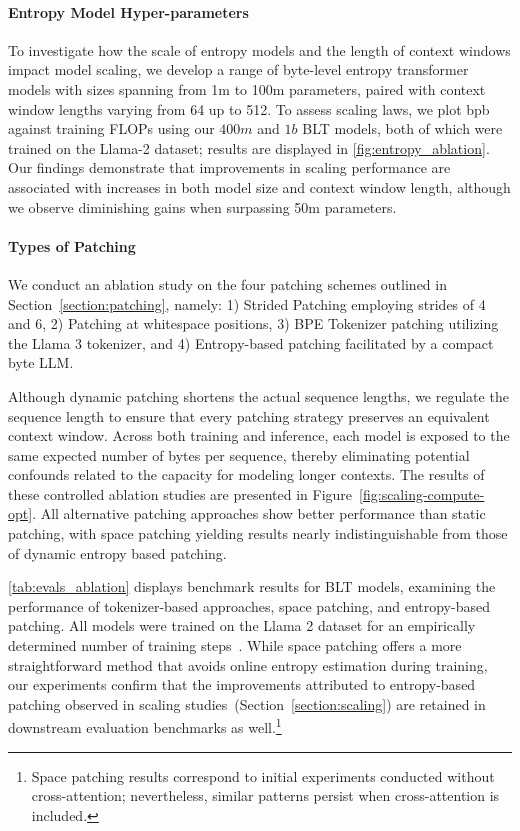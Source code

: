 \paragraph{Entropy Model Hyper-parameters} To investigate how the scale of entropy models and the length of context windows impact model scaling, we develop a range of byte-level entropy transformer models with sizes spanning from 1m to 100m parameters, paired with context window lengths varying from 64 up to 512. To assess scaling laws, we plot bpb against training FLOPs using our $400m$ and $1b$ {\textsc BLT} models, both of which were trained on the Llama-2 dataset; results are displayed in \autoref{fig:entropy_ablation}. Our findings demonstrate that improvements in scaling performance are associated with increases in both model size and context window length, although we observe diminishing gains when surpassing 50m parameters.

\paragraph{Types of Patching}

We conduct an ablation study on the four patching schemes outlined in Section~\ref{section:patching}, namely: 1) Strided Patching employing strides of 4 and 6, 2) Patching at whitespace positions, 3) BPE Tokenizer patching utilizing the Llama 3 tokenizer, and 4) Entropy-based patching facilitated by a compact byte LLM.

Although dynamic patching shortens the actual sequence lengths, we regulate the sequence length to ensure that every patching strategy preserves an equivalent context window. Across both training and inference, each model is exposed to the same expected number of bytes per sequence, thereby eliminating potential confounds related to the capacity for modeling longer contexts. The results of these controlled ablation studies are presented in Figure~\ref{fig:scaling-compute-opt}. All alternative patching approaches show better performance than static patching, with space patching yielding results nearly indistinguishable from those of dynamic entropy based patching.

\autoref{tab:evals_ablation} displays benchmark results for {\textsc BLT} models, examining the performance of tokenizer-based approaches, space patching, and entropy-based patching. All models were trained on the Llama 2 dataset for an empirically determined number of training steps~\citep{dubey2024llama}. While space patching offers a more straightforward method that avoids online entropy estimation during training, our experiments confirm that the improvements attributed to entropy-based patching observed in scaling studies~(Section~\ref{section:scaling}) are retained in downstream evaluation benchmarks as well.\footnote{Space patching results correspond to initial experiments conducted without cross-attention; nevertheless, similar patterns persist when cross-attention is included.}

